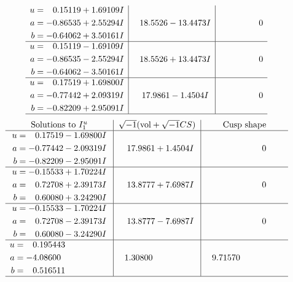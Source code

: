 \documentclass[1p]{elsarticle_modified}
\theoremstyle{definition}
\newcommand{\I}{\sqrt{-1}}
\begin{document}
$$\begin{array}{c|c|c}
\begin{aligned}
u &= \phantom{-}0.15119 + 1.69109 I \\
a &= -0.86535 + 2.55294 I \\
b &= -0.64062 + 3.50161 I\end{aligned}
 & \phantom{-}18.5526 - 13.4473 I & \phantom{-0.000000 } 0 \\ \hline\begin{aligned}
u &= \phantom{-}0.15119 - 1.69109 I \\
a &= -0.86535 - 2.55294 I \\
b &= -0.64062 - 3.50161 I\end{aligned}
 & \phantom{-}18.5526 + 13.4473 I & \phantom{-0.000000 } 0 \\ \hline\begin{aligned}
u &= \phantom{-}0.17519 + 1.69800 I \\
a &= -0.77442 + 2.09319 I \\
b &= -0.82209 + 2.95091 I\end{aligned}
 & \phantom{-}17.9861 - 1.4504 I & \phantom{-0.000000 } 0\\
 \hline 
 \end{array}$$\newpage$$\begin{array}{c|c|c}  
\text{Solutions to }I^u_{1}& \I (\text{vol} + \sqrt{-1}CS) & \text{Cusp shape}\\
 \hline 
\begin{aligned}
u &= \phantom{-}0.17519 - 1.69800 I \\
a &= -0.77442 - 2.09319 I \\
b &= -0.82209 - 2.95091 I\end{aligned}
 & \phantom{-}17.9861 + 1.4504 I & \phantom{-0.000000 } 0 \\ \hline\begin{aligned}
u &= -0.15533 + 1.70224 I \\
a &= \phantom{-}0.72708 + 2.39173 I \\
b &= \phantom{-}0.60080 + 3.24290 I\end{aligned}
 & \phantom{-}13.8777 + 7.6987 I & \phantom{-0.000000 } 0 \\ \hline\begin{aligned}
u &= -0.15533 - 1.70224 I \\
a &= \phantom{-}0.72708 - 2.39173 I \\
b &= \phantom{-}0.60080 - 3.24290 I\end{aligned}
 & \phantom{-}13.8777 - 7.6987 I & \phantom{-0.000000 } 0 \\ \hline\begin{aligned}
u &= \phantom{-}0.195443\phantom{ +0.000000I} \\
a &= -4.08600\phantom{ +0.000000I} \\
b &= \phantom{-}0.516511\phantom{ +0.000000I}\end{aligned}
 & \phantom{-}1.30800\phantom{ +0.000000I} & \phantom{-}9.71570\phantom{ +0.000000I}\\
 \hline 
 \end{array}$$\newpage\newpage\renewcommand{\arraystretch}{1}
\end{document}
